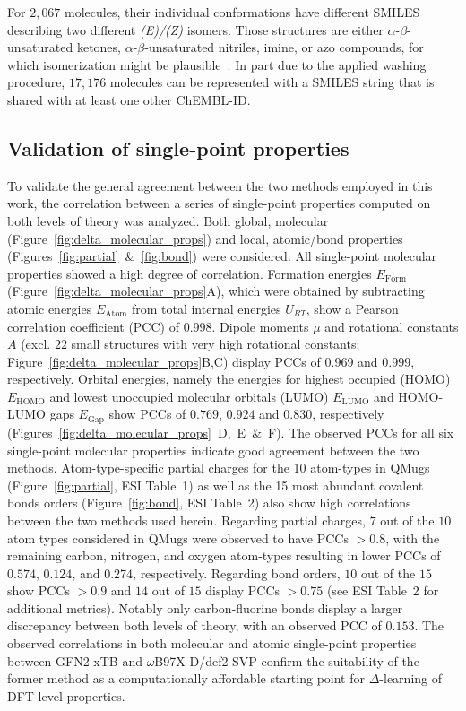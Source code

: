 For $2,067$ molecules, their individual conformations have different SMILES describing two different \textit{(E)/(Z)} isomers. Those structures are either $\alpha$-$\beta$-unsaturated ketones, $\alpha$-$\beta$-unsaturated nitriles, imine, or azo compounds, for which isomerization might be plausible~\cite{goulet2017electrocatalytic, roca2014dft}. In part due to the applied washing procedure, $17,176$ molecules can be represented with a SMILES string that is shared with at least one other ChEMBL-ID. 


\subsection*{Validation of single-point properties}

To validate the general agreement between the two methods employed in this work, the correlation between a series of single-point properties computed on both levels of theory was analyzed. Both global, molecular (Figure~\ref{fig:delta_molecular_props}) and local, atomic/bond properties (Figures~\ref{fig:partial}~\&~\ref{fig:bond}) were considered. All single-point molecular properties showed a high degree of correlation. Formation energies $E_\mathrm{Form}$ (Figure~\ref{fig:delta_molecular_props}A), which were obtained by subtracting atomic energies $E_{\mathrm{Atom}}$ from total internal energies $U_{RT}$, show a Pearson correlation coefficient (PCC) of $0.998$. Dipole moments $\mu$ and rotational constants $A$ (excl. $22$ small structures with very high rotational constants; Figure~\ref{fig:delta_molecular_props}B,C) display PCCs of $0.969$ and $0.999$, respectively. Orbital energies, namely the energies for highest occupied (HOMO)  $E_{\mathrm{HOMO}}$ and lowest unoccupied molecular orbitals (LUMO) $E_{\mathrm{LUMO}}$ and HOMO-LUMO gaps $E_{\mathrm{Gap}}$ show PCCs of $0.769$, $0.924$ and $0.830$, respectively (Figures~\ref{fig:delta_molecular_props}~D,~E~\&~F). The observed PCCs for all six single-point molecular properties indicate good agreement between the two methods. Atom-type-specific partial charges for the 10 atom-types in QMugs (Figure~\ref{fig:partial}, ESI Table~1) as well as the 15 most abundant covalent bonds orders (Figure~\ref{fig:bond}, ESI Table~2) also show high correlations between the two methods used herein. Regarding partial charges, $7$ out of the $10$ atom types considered in QMugs were observed to have PCCs $>0.8$, with the remaining carbon, nitrogen, and oxygen atom-types resulting in lower PCCs of $0.574$, $0.124$, and $0.274$, respectively. Regarding bond orders, $10$ out of the $15$ show PCCs $>0.9$ and $14$ out of $15$ display PCCs $>0.75$ (see ESI Table~2 for additional metrics). Notably only carbon-fluorine bonds display a larger discrepancy between both levels of theory, with an observed PCC of $0.153$. The observed correlations in both molecular and atomic single-point properties between GFN2-xTB and $\omega$B97X-D/def2-SVP confirm the suitability of the former method as a computationally affordable starting point for $\Delta$-learning of DFT-level properties.
